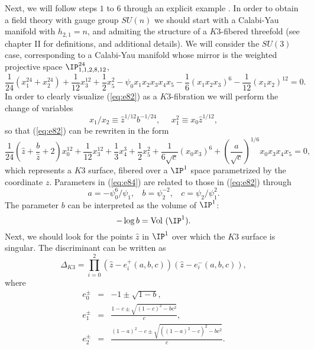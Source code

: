 Next, we will follow steps $1$ to $6$ through an explicit
example \cite{KLMVW}. In order to obtain a field theory with gauge group
$SU(n)$ we should start with a Calabi-Yau manifold with
$h_{2,1}=n$, and admiting the structure of a $K3$-fibered
threefold (see chapter II for definitions, and additional
details). We will consider the $SU(3)$ case, corresponding to a
Calabi-Yau manifold whose mirror is the weighted projective space
$\IP_{1,1,2,8,12}^{24}$,
\begin{equation}
\frac {1}{24}(x_1^{24} +x_2^{24}) + \frac {1}{12} x_3^{12} +
\frac {1}{2} x_5^{2} - \psi_0 x_1x_2x_3x_4x_5 - \frac {1}{6}
(x_1x_2x_3)^6- \frac {1}{12} (x_1x_2)^{12} =0.
\label{eq:e82}
\end{equation}
In order to clearly visualize (\ref{eq:e82}) as a $K3$-fibration
we will perform the change of variables
\begin{equation}
x_1/x_2 \equiv \hat{z} ^{1/12} b^{-1/24}, \: \: \: \: \: \:
x_1^{2} \equiv x_0 \hat{z}^{1/12}, 
\label{eq:e83}
\end{equation}
so that (\ref{eq:e82}) can be rewriten in the form
\begin{equation}
\frac {1}{24} (\hat{z} + \frac {b}{\hat{z}} +2)x_0^{12} + \frac
{1}{12}x_3^{12} + \frac {1}{3}x_4^3+ \frac {1}{2} x_5^2 + \frac
{1}{6 \sqrt{c}} (x_0 x_3)^6 + \left( \frac {a}{\sqrt{c}}
\right)^{1/6} x_0 x_3 x_4 x_5 =0,
\label{eq:e84}
\end{equation}
which represents a $K3$ surface, fibered over a $\IP^1$ space 
parametrized by the coordinate $z$. Parameters in (\ref{eq:e84})
are related to those in (\ref{eq:e82}) through
\begin{equation}
a = - \psi_0^6/\psi_1, \: \: \: \: b=\psi_2^{-2}, \: \: \: \:
c=\psi_2/\psi_1^2.
\label{eq:e85}
\end{equation}
The parameter $b$ can be interpreted as the volume of $\IP^1$:
\begin{equation}
- \log b = \hbox {Vol }(\IP^1).
\label{eq:e86}
\end{equation}
Next, we should look for the points $\hat{z}$ in $\IP^1$
over which the $K3$ surface is singular. The discriminant can be
written as
\begin{equation}
\Delta_{K3} = \prod_{i=0}^2
(\hat{z}-e_i^+(a,b,c))(\hat{z}-e_i^-(a,b,c)), 
\label{eq:e87}
\end{equation}
where 
\begin{eqnarray}
e_0^{\pm} & = & -1 \pm \sqrt{1-b}, \nonumber\\
e_1^{\pm} & = & \frac {1-c \pm \sqrt{(1-c)^2-bc^2}}{c}, \nonumber\\
e_2^{\pm} & = & \frac {(1-a)^2-c \pm \sqrt{((1-a)^2-c)^2-bc^2}}{c}.
\label{eq:e88}
\end{eqnarray}
